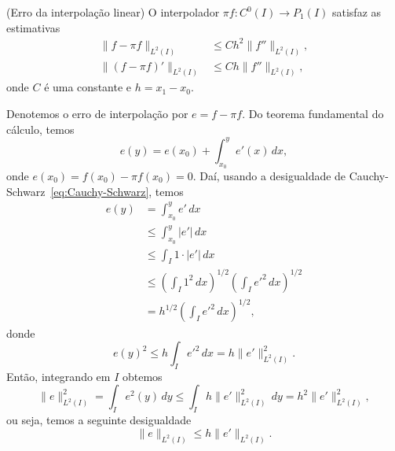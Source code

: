 \begin{prop}\normalfont(Erro da interpolação linear)\label{prop:interp_lin}
  O interpolador $\pi f:C^0(I)\to P_1(I)$ satisfaz as estimativas
  \begin{align}
    \|f-\pi f\|_{L^2(I)} &\leq Ch^2\|f''\|_{L^2(I)},\\
    \|(f-\pi f)'\|_{L^2(I)} &\leq Ch\|f''\|_{L^2(I)},
  \end{align}
onde $C$ é uma constante e $h=x_1-x_0$.
\end{prop}
\begin{dem}
  Denotemos o erro de interpolação por $e = f - \pi f$. Do teorema fundamental do cálculo, temos
  \begin{equation}
    e(y) = e(x_0) + \int_{x_0}^y e'(x)\,dx,
  \end{equation}
onde $e(x_0)=f(x_0)-\pi f(x_0) = 0$. Daí, usando a desigualdade de Cauchy-Schwarz~\eqref{eq:Cauchy-Schwarz}, temos
\begin{align}
  e(y) &= \int_{x_0}^y e'\,dx\\
       &\leq \int_{x_0}^y |e'|\,dx\\
       &\leq \int_{I} 1\cdot |e'|\,dx\\
       &\leq \left(\int_{I} 1^2\,dx\right)^{1/2} \left(\int_{I} e'^2\,dx\right)^{1/2}\\
       &= h^{1/2}\left(\int_{I} e'^2\,dx\right)^{1/2},
\end{align}
donde
\begin{equation}
  e(y)^2 \leq h\int_I e'^2\,dx = h\|e'\|_{L^2(I)}^2.
\end{equation}
Então, integrando em $I$ obtemos
\begin{equation}
  \|e\|_{L^2(I)}^2 = \int_I e^2(y)\,dy \leq \int_I h\|e'\|_{L^2(I)}^2\,dy = h^2\|e'\|_{L^2(I)}^2,
\end{equation}
ou seja, temos a seguinte desigualdade
\begin{equation}\label{eq:prop_pif_0}
  \|e\|_{L^2(I)} \leq h\|e'\|_{L^2(I)}.
\end{equation}


\end{dem}
